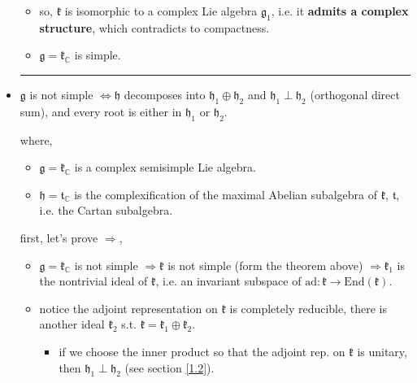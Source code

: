 \begin{itemize}
\begin{tcolorbox}[title=proof:]
\begin{itemize}
			\item so, $\mathfrak{k}$ is isomorphic to a complex Lie algebra $\mathfrak{g}_1$, i.e. it \textbf{admits a complex structure}, which contradicts to compactness.
			
			\item $\mathfrak{g} = \mathfrak{k}_\mathbb{C}$ is simple.
		\end{itemize}
	\end{tcolorbox}
	
	\noindent\rule[0.5ex]{\linewidth}{0.5pt} %
	
	\item $\mathfrak{g}$ is not simple $\iff \mathfrak{h}$ decomposes into $\mathfrak{h}_1 \oplus \mathfrak{h}_2$ and $\mathfrak{h}_1 \perp \mathfrak{h}_2$ (orthogonal direct sum), and every root is either in $\mathfrak{h}_1$ or $\mathfrak{h}_2$.
	
	where,
	\begin{itemize}
		\item $\mathfrak{g} = \mathfrak{k}_\mathbb{C}$ is a complex semisimple Lie algebra.
		
		\item $\mathfrak{h} = \mathfrak{t}_\mathbb{C}$ is the complexification of the maximal Abelian subalgebra of $\mathfrak{k}$, $\mathfrak{t}$, i.e. the Cartan subalgebra.
	\end{itemize}
	
	\begin{tcolorbox}[title=proof:]
		first, let's prove $\Longrightarrow$,
		\begin{itemize}
			\item $\mathfrak{g} = \mathfrak{k}_\mathbb{C}$ is not simple $\Longrightarrow \mathfrak{k}$ is not simple (form the theorem above) $\Longrightarrow \mathfrak{k}_1$ is the nontrivial ideal of $\mathfrak{k}$, i.e. an invariant subspace of $\mathrm{ad} : \mathfrak{k} \rightarrow \mathrm{End}(\mathfrak{k})$.
			
			\item notice the adjoint representation on $\mathfrak{k}$ is completely reducible, there is another ideal $\mathfrak{k}_2$ s.t. $\mathfrak{k} = \mathfrak{k}_1 \oplus \mathfrak{k}_2$.
			\begin{itemize}
				\item if we choose the inner product so that the adjoint rep. on $\mathfrak{k}$ is unitary, then $\mathfrak{h}_1 \perp \mathfrak{h}_2$ (see section \ref{1.2}).
			\end{itemize}
			

\end{itemize}
\end{tcolorbox}
\end{itemize}
